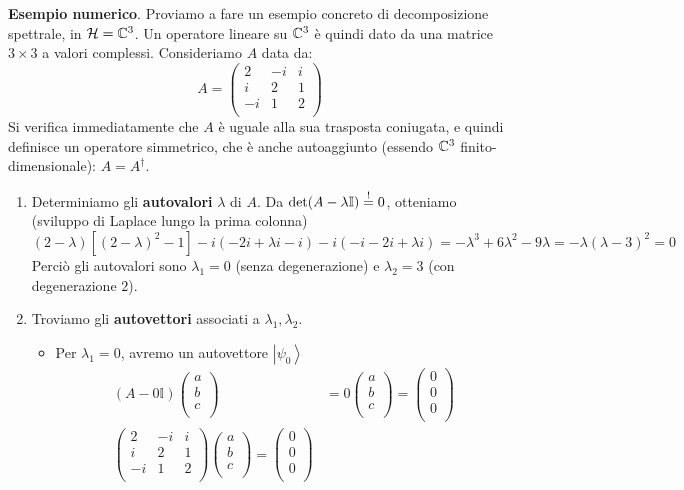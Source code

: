 \documentclass[../../FisicaTeorica.tex]{subfiles}
\begin{document}
\textbf{Esempio numerico}. 
Proviamo a fare un esempio concreto di decomposizione spettrale, in $\mathcal{H} = \mathbb{C}^3$. Un operatore lineare su $\mathbb{C}^3$ è quindi dato da una matrice $3\times 3$ a valori complessi. Consideriamo $A$ data da:
\[
A=\left(\begin{matrix}2&-i&i\\i&2&1\\-i&1&2\\\end{matrix}\right) 
\]
Si verifica immediatamente che $A$ è uguale alla sua trasposta coniugata, e quindi definisce un operatore simmetrico, che è anche autoaggiunto (essendo $\mathbb{C}^3$ finito-dimensionale): $A = A^\dag$.\\
\begin{enumerate}
    \item Determiniamo gli \textbf{autovalori} $\lambda$ di $A$. Da $\operatorname{det}(A-\lambda \mathbb{I}) \overset{!}{=} 0$, otteniamo (sviluppo di Laplace lungo la prima colonna)
    \[
    (2-\lambda)[(2-\lambda)^2-1]-i(-2i+\lambda i -i)-i(-i -2i +\lambda i) = -\lambda^3 + 6\lambda^2 - 9\lambda = -\lambda(\lambda -3)^2 = 0
    \]
    Perciò gli autovalori sono $\lambda_1 = 0$ (senza degenerazione) e $\lambda_2 = 3$ (con degenerazione $2$).\\
    \item Troviamo gli \textbf{autovettori} associati a $\lambda_1, \lambda_2$.
    \begin{itemize}
    \item Per $\lambda_1 =0$, avremo un autovettore $\left|\psi_0\right\rangle$
	\begin{align*}
	\left(A-0\mathbb{I}\right)\left(\begin{matrix}a\\b\\c\\\end{matrix}\right)&=0\left(\begin{matrix}a\\b\\c\\\end{matrix}\right)=\left(\begin{matrix}0\\0\\0\\\end{matrix}\right)\\
	\left(\begin{matrix}2&-i&i\\i&2&1\\-i&1&2\\\end{matrix}\right)\left(\begin{matrix}a\\b\\c\\\end{matrix}\right)=\left(\begin{matrix}0\\0\\0\\\end{matrix}\right)

\end{align*}
\end{itemize}
\end{enumerate}
\end{document}
